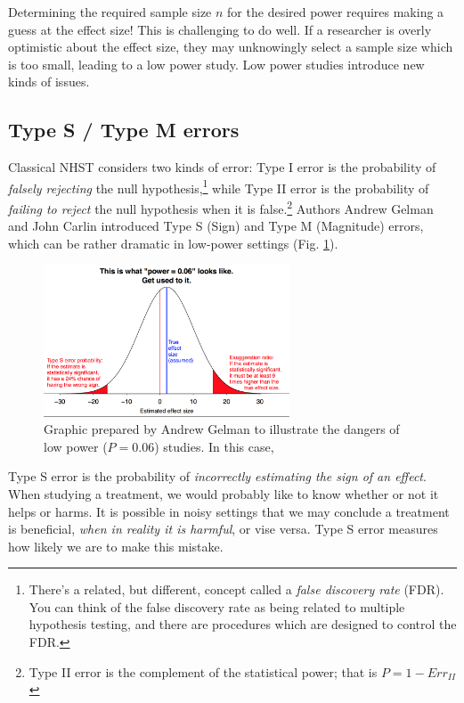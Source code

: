 \documentclass{tufte-handout}
\begin{document}
Determining the required sample size \(n\) for the desired power requires making a
guess at the effect size! This is challenging to do well. If a researcher is
overly optimistic about the effect size, they may unknowingly select a sample
size which is too small, leading to a low power study. Low power studies
introduce new kinds of issues.

\subsection{Type S / Type M errors}
\label{sec:orge50beec}
Classical NHST considers two kinds of error: Type I error is the probability of
\emph{falsely rejecting} the null hypothesis,\footnote{There's a related, but different,
concept called a \emph{false discovery rate} (FDR). You can think of the false
discovery rate as being related to multiple hypothesis testing, and there are
procedures which are designed to control the FDR.} while Type II error is the
probability of \emph{failing to reject} the null hypothesis when it is
false.\footnote{Type II error is the complement of the statistical power; that is
\(P=1-Err_{II}\)} Authors Andrew Gelman and John Carlin \cite{gelman2014beyond}
introduced Type S (Sign) and Type M (Magnitude) errors, which can be rather
dramatic in low-power settings (Fig. \ref{fig:power006}).

\begin{figure}[!ht]
  \centering
  \includegraphics[width=0.65\textwidth]{images/power006}
  \caption{Graphic prepared by Andrew Gelman to illustrate the dangers of low
  power ($P=0.06$) studies. In this case, }
  \label{fig:power006}
\end{figure}

Type S error is the probability of \emph{incorrectly estimating the sign of an
effect}. When studying a treatment, we would probably like to know whether or
not it helps or harms. It is possible in noisy settings that we may conclude a
treatment is beneficial, \emph{when in reality it is harmful}, or vise versa. Type S
error measures how likely we are to make this mistake.
\end{document}
